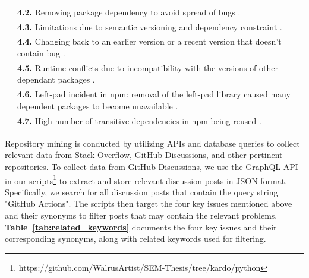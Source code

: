 \documentclass[conference]{IEEEtran}
\begin{document}
\begin{table}[!t]
\begin{tabular}{|p{3cm}|p{14cm}|}
						     & \textbf{4.2.} Removing package dependency to avoid spread of bugs \cite{decan2018impact} . \\	
						     & \textbf{4.3.} Limitations due to semantic versioning and dependency constraint \cite{decan2018impact}.\\
						     & \textbf{4.4.} Changing back to an earlier version or a recent version that doesn’t contain bug \cite{decan2018impact}  .\\
						     & \textbf{4.5.} Runtime conflicts due to incompatibility with
the versions of other dependant packages \cite{dietrich2019dependency}.
 \\
						     & \textbf{4.6.} Left-pad incident in npm: removal of the left-pad library caused many dependent packages to become unavailable \cite{zimmermann2019small}.  \\
						     & \textbf{4.7.} High number of transitive dependencies in npm  being reused \cite{zimmermann2019small}.  \\
        \hline
    \end{tabular}
\end{table}
             Repository mining is conducted by utilizing APIs and database queries to collect relevant data from Stack Overflow, GitHub Discussions, and other pertinent repositories. To collect data from GitHub Discussions, we use the GraphQL API in our scripts\footnote{https://github.com/WalrusArtist/SEM-Thesis/tree/kardo/python} to extract and store relevant discussion posts in JSON format. Specifically, we search for all discussion posts that contain the query string "GitHub Actions". The scripts then target the four key issues mentioned above and their synonyms to filter posts that may contain the relevant problems. \textbf{Table~\ref{tab:related_keywords}} documents the four key issues and their corresponding synonyms, along with related keywords used for filtering. \\
\end{document}
